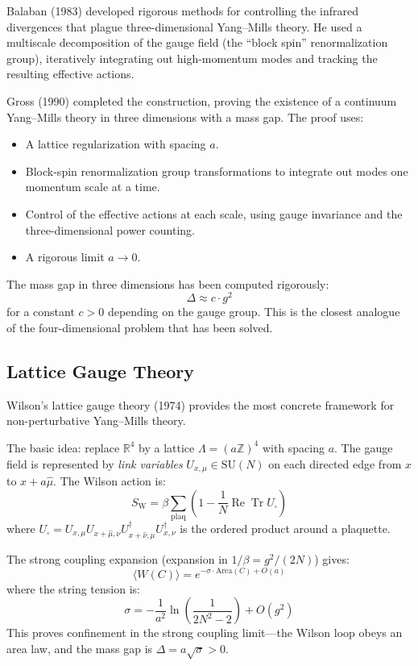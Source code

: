 Balaban (1983) developed rigorous methods for controlling the infrared divergences that plague three-dimensional Yang--Mills theory. He used a multiscale decomposition of the gauge field (the ``block spin'' renormalization group), iteratively integrating out high-momentum modes and tracking the resulting effective actions.

Gross (1990) completed the construction, proving the existence of a continuum Yang--Mills theory in three dimensions with a mass gap. The proof uses:
\begin{itemize}
  \item A lattice regularization with spacing $a$.
  \item Block-spin renormalization group transformations to integrate out modes one momentum scale at a time.
  \item Control of the effective actions at each scale, using gauge invariance and the three-dimensional power counting.
  \item A rigorous limit $a \to 0$.
\end{itemize}

The mass gap in three dimensions has been computed rigorously:
\[
\Delta \approx c \cdot g^2
\]
for a constant $c > 0$ depending on the gauge group. This is the closest analogue of the four-dimensional problem that has been solved.

\subsection{Lattice Gauge Theory}

Wilson's lattice gauge theory (1974) provides the most concrete framework for non-perturbative Yang--Mills theory.

The basic idea: replace $\mathbb{R}^4$ by a lattice $\Lambda = (a\mathbb{Z})^4$ with spacing $a$. The gauge field is represented by \textit{link variables} $U_{x,\mu} \in \mathrm{SU}(N)$ on each directed edge from $x$ to $x + a\hat{\mu}$. The Wilson action is:
\[
S_{\mathrm{W}} = \beta \sum_{\text{plaq}} \left(1 - \frac{1}{N}\operatorname{Re}\operatorname{Tr} U_{\square}\right)
\]
where $U_{\square} = U_{x,\mu} U_{x+\hat{\mu},\nu} U_{x+\hat{\nu},\mu}^\dagger U_{x,\nu}^\dagger$ is the ordered product around a plaquette.

The strong coupling expansion (expansion in $1/\beta = g^2/(2N)$) gives:
\[
\langle W(C) \rangle = e^{-\sigma \cdot \mathrm{Area}(C) + O(a)}
\]
where the string tension is:
\[
\sigma = -\frac{1}{a^2} \ln\left(\frac{1}{2N^2 - 2}\right) + O(g^2)
\]
This proves confinement in the strong coupling limit---the Wilson loop obeys an area law, and the mass gap is $\Delta = a\sqrt{\sigma} > 0$.

